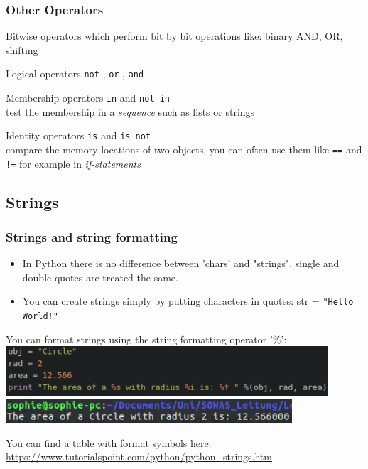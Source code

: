 \documentclass{beamer}
\begin{document}
\begin{frame}
\frametitle{Other Operators}
	\begin{alertblock}{Bitwise operators} 
		which perform bit by bit operations like: binary AND, OR, shifting
	\end{alertblock}
	\begin{alertblock}{Logical operators} 
		\texttt{not} , \texttt{or} , \texttt{and} \\
	\end{alertblock}
	\begin{alertblock} {Membership operators} 
		\texttt{in} and \texttt{not in} \\test the membership in a \textit{sequence} such as lists or strings
	\end{alertblock}
	\begin{alertblock}{Identity operators} 
		\texttt{is} and \texttt{is not} \\compare the memory locations of two objects, you can often use them like \texttt{==} and \texttt{!=}	for example in \textit{if-statements}
	\end{alertblock}
\end{frame}

\subsection{Strings}

\begin{frame}
\frametitle{Strings and string formatting}
	\begin{itemize}
		\item In Python there is no difference between 'chars' and "strings", single and double quotes are treated the same.
		\item You can create strings simply by putting characters in quotes: str = \texttt{"Hello World!"}
	\end{itemize}
	You can format strings using the string formatting operator '\%': \\
	\includegraphics[width = 0.9\textwidth]{StringFormat.pdf} \\
	\includegraphics[width = 0.8\textwidth]{StringFormatOutput.pdf}
	
	You can find a table with format symbols here: \url{https://www.tutorialspoint.com/python/python_strings.htm}
\end{frame}
\end{document}
